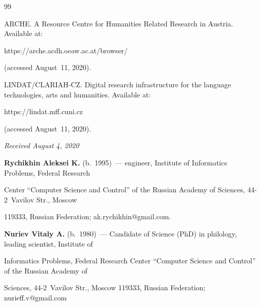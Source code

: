 {{\begin{thebibliography}{99}

ARCHE. A Resource Centre for Humanities Related Research in Austria. Available at: {\sf 

https://arche.acdh.oeaw.ac.at/browser/} (accessed August~11, 2020).


LINDAT/CLARIAH-CZ. Digital research infrastructure for the language technologies, arts and humanities. Available at: {\sf 

https://lindat.mff.cuni.cz} (accessed August~11, 2020).

\end{thebibliography}

} }






\hfill{\small\textit{Received August 4, 2020}} 






\Contr



\noindent

\textbf{Rychikhin Aleksei K.} (b.\ 1995)~--- engineer, Institute of Informatics Problems, Federal Research 

Center ``Computer Science and Control'' of the Russian Academy of Sciences, 44-2~Vavilov Str., Moscow 

119333, Russian Federation; \mbox{ak.rychikhin@gmail.com.}



\vspace*{3pt}



\noindent

\textbf{Nuriev Vitaly A.} (b.\ 1980)~--- Candidate of Science (PhD) in philology, leading scientist, Institute of 

Informatics Problems, Federal Research Center ``Computer Science and Control'' of the Russian Academy of 

Sciences, 44-2~Vavilov Str., Moscow 119333, Russian Federation; \mbox{nurieff.v@gmail.com}





\label{end\stat}



\renewcommand{\bibname}{\protect\rm Литература} 

